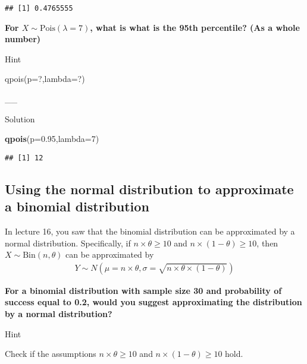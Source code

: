 \documentclass[
]{book}
\newenvironment{Shaded}{\begin{snugshade}}{\end{snugshade}}
\newcommand{\AttributeTok}[1]{\textcolor[rgb]{0.13,0.29,0.53}{#1}}
\newcommand{\DecValTok}[1]{\textcolor[rgb]{0.00,0.00,0.81}{#1}}
\newcommand{\FloatTok}[1]{\textcolor[rgb]{0.00,0.00,0.81}{#1}}
\newcommand{\FunctionTok}[1]{\textcolor[rgb]{0.13,0.29,0.53}{\textbf{#1}}}
\newcommand{\NormalTok}[1]{#1}
\begin{document}
\begin{verbatim}
## [1] 0.4765555
\end{verbatim}

\textbf{For \(X\sim \mbox{Pois}(\lambda=7)\), what is what is the 95th percentile? (As a whole number)}

Hint

qpois(p=?,lambda=?)

\_\_

Solution

\begin{Shaded}
\begin{Highlighting}[]
\FunctionTok{qpois}\NormalTok{(}\AttributeTok{p=}\FloatTok{0.95}\NormalTok{,}\AttributeTok{lambda=}\DecValTok{7}\NormalTok{)}
\end{Highlighting}
\end{Shaded}

\begin{verbatim}
## [1] 12
\end{verbatim}

\hypertarget{using-the-normal-distribution-to-approximate-a-binomial-distribution}{%
\subsection{Using the normal distribution to approximate a binomial distribution}\label{using-the-normal-distribution-to-approximate-a-binomial-distribution}}

In lecture 16, you saw that the binomial distribution can be approximated by a normal distribution. Specifically, if \(n \times \theta \geq 10\) and \(n \times (1-\theta) \geq 10\), then \(X \sim \mbox{Bin}(n,\theta)\) can be approximated by
\begin{align*}
Y \sim N\left(\mu=n \times \theta,\sigma=\sqrt{n \times \theta \times (1-\theta)}\right)
\end{align*}

\textbf{For a binomial distribution with sample size 30 and probability of success equal to 0.2, would you suggest approximating the distribution by a normal distribution?}

Hint

Check if the assumptions \(n \times \theta \geq 10\) and \(n \times (1-\theta) \geq 10\) hold.
\end{document}

